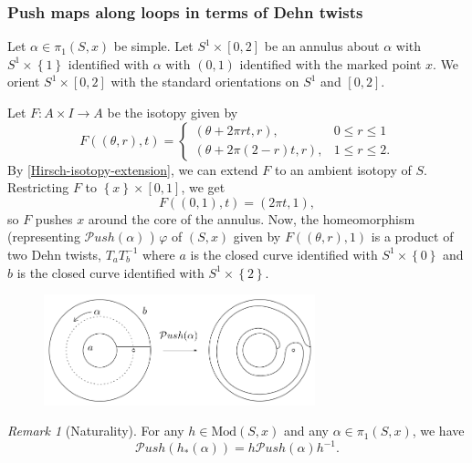 \documentclass[reqno]{amsart}
\theoremstyle{definition}
\theoremstyle{remark}
\newtheorem*{remark}{Remark}
\newcommand{\Mod}{{\mathrm{Mod}}}
\newcommand{\Push}{{\mathcal{P}}ush}
\begin{document}
 \subsubsection{Push maps along loops in terms of Dehn twists}

 Let $\alpha \in \pi_1 \left( S,x \right) $ be simple.
 Let $S^{1} \times \left[ 0,2 \right] $ be an annulus
 about $\alpha$ with $S^{1} \times \left\{ 1 \right\} $ 
 identified with $\alpha$ with
 $(0,1)$ identified with the marked point
 $x$. We orient 
 $S^{1} \times \left[ 0,2 \right] $ with the
 standard orientations on
 $S^{1}$ and $\left[ 0,2 \right] $. 

 Let $F \colon A \times I \to A$ be the
 isotopy given by
 \[
 F \left( \left( \theta,r \right) ,t \right) 
 = 
 \begin{cases}
     \left( \theta + 2\pi r t, r \right) ,& 0 \le r \le 1\\
     \left( \theta + 2 \pi (2-r)t,r \right) ,& 1 \le r \le 2.
 \end{cases}
 \]
 By \ref{Hirsch-isotopy-extension}, we can extend
 $F$ to an ambient isotopy of $S$. Restricting
 $F$ to $\left\{ x \right\} \times \left[ 0,1 \right] $, we
 get
 \[
 F\left( (0,1),t \right) = \left( 2 \pi t,1 \right),
 \] 
 so $F$ pushes $x$ around the core of the annulus.
 Now, the homeomorphism (representing $\Push\left( \alpha \right) $ )
 $\varphi $ of $\left( S,x \right) $ given by
 $F\left( (\theta, r),1 \right) $ is a product
 of two Dehn twists,  $T_a T_{b}^{-1}$ where
 $a$ is the closed curve identified with
 $S^{1} \times \left\{ 0 \right\} $ and
 $b$ is the closed curve identified with
 $S^{1} \times \left\{ 2 \right\} $.

 \begin{figure}[htpb]
     \centering
     \includegraphics[width=0.7\textwidth]{push-point-map.png}
     \label{fig:push-point-map-png}
 \end{figure}

 \begin{remark}[Naturality]
     For any $h \in \Mod (S,x)$ and any
     $\alpha \in \pi_1 \left( S,x \right) $, we have
     \[
     \Push \left( h_* \left( \alpha \right)  \right) 
     = h\Push \left( \alpha \right) h^{-1}.
     \] 
 \end{remark}
\end{document}
